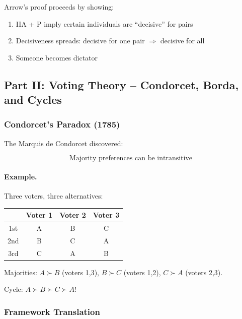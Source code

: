Arrow's proof proceeds by showing:
\begin{enumerate}
    \item IIA + P imply certain individuals are ``decisive'' for pairs
    \item Decisiveness spreads: decisive for one pair $\Rightarrow$ decisive for all
    \item Someone becomes dictator
\end{enumerate}

\subsection{Part II: Voting Theory – Condorcet, Borda, and Cycles}

\subsubsection{Condorcet's Paradox (1785)}

The Marquis de Condorcet discovered:

\begin{equation}
\boxed{
\text{Majority preferences can be intransitive}
}
\label{eq:condorcet}
\end{equation}

\paragraph{Example.}
Three voters, three alternatives:
\begin{center}
\begin{tabular}{|c|c|c|c|}
\hline
& Voter 1 & Voter 2 & Voter 3 \\
\hline
1st & A & B & C \\
2nd & B & C & A \\
3rd & C & A & B \\
\hline
\end{tabular}
\end{center}

Majorities: $A \succ B$ (voters 1,3), $B \succ C$ (voters 1,2), $C \succ A$ (voters 2,3).

Cycle: $A \succ B \succ C \succ A$!

\subsubsection{Framework Translation}

